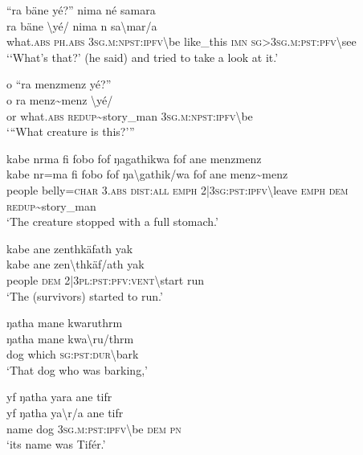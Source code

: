 \ea\label{ex:1:a3551}
``ra bäne yé?'' nima né samara\\
\gll ra	bäne	{\textbackslash}yé/	nima	n	sa{\textbackslash}mar/a\\
     what.\textsc{abs}	\textsc{ph}.\textsc{abs}	3\textsc{sg}.\textsc{m}:\textsc{npst}:\textsc{ipfv}{\textbackslash}be	like\_this	\textsc{imn}	\textsc{sg}>3\textsc{sg}.\textsc{m}:\textsc{pst}:\textsc{pfv}{\textbackslash}see\\
\glt `‘What's that?’ (he said) and tried to take a look at it.'
\z

\ea\label{ex:1:a3552}
o ``ra menzmenz yé?''\\
\gll o	ra	menz{\textasciitilde}menz	{\textbackslash}yé/\\
     or	what.\textsc{abs}	\textsc{redup}{\textasciitilde}story\_man	3\textsc{sg}.\textsc{m}:\textsc{npst}:\textsc{ipfv}{\textbackslash}be\\
\glt `{``}What creature is this?'''
\z

\ea\label{ex:1:a3553}
kabe nrma fi fobo fof ŋagathikwa fof ane menzmenz\\
\gll kabe	nr=ma	fi	fobo	fof	ŋa{\textbackslash}gathik/wa	fof	ane	menz{\textasciitilde}menz\\
     people	belly=\textsc{char}	3.\textsc{abs}	\textsc{dist}:\textsc{all}	\textsc{emph}	2|3\textsc{sg}:\textsc{pst}:\textsc{ipfv}{\textbackslash}leave	\textsc{emph}	\textsc{dem}	\textsc{redup}{\textasciitilde}story\_man\\
\glt `The creature stopped with a full stomach.'
\z

\ea\label{ex:1:a3555}
kabe ane zenthkäfath yak\\
\gll kabe	ane	zen{\textbackslash}thkäf/ath	yak\\
     people	\textsc{dem}	2|3\textsc{pl}:\textsc{pst}:\textsc{pfv}:\textsc{vent}{\textbackslash}start	run\\
\glt `The (survivors) started to run.'
\z

\ea\label{ex:1:a3556}
ŋatha mane kwaruthrm\\
\gll ŋatha	mane	kwa{\textbackslash}ru/thrm\\
     dog	which	\textsc{sg}:\textsc{pst}:\textsc{dur}{\textbackslash}bark\\
\glt `That dog who was barking,'
\z

\ea\label{ex:1:a3557}
yf ŋatha yara ane tifr\\
\gll yf	ŋatha	ya{\textbackslash}r/a	ane	tifr\\
     name	dog	3\textsc{sg}.\textsc{m}:\textsc{pst}:\textsc{ipfv}{\textbackslash}be	\textsc{dem}	\textsc{pn}\\
\glt `its name was Tifér.'
\z

